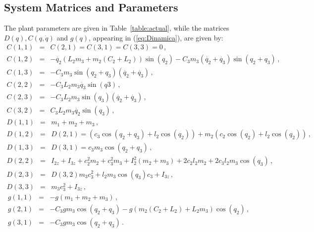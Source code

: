 \documentclass[letterpaper, 10 pt, journal, twocolumn]{IEEEtran}  %
\theoremstyle{plain}
\theoremstyle{definition}
\theoremstyle{remark}
\begin{document}
\begin{footnotesize}
\end{footnotesize}
 
%
%
%
%



\appendix


\subsection{System Matrices and Parameters}\label{ap:system}


The plant parameters are given in Table~\ref{table:actual}, while the matrices $D(q), C(q,\dot{q})$ and $g(q)$, appearing in (\ref{eq:Dinamica}), are given by:
%
\begin{eqnarray}
C(1,1) &=&  C(2,1) = C(3,1)=C(3,3)=0\,, \nonumber\\
C(1,2) & =& -\dot{q_2}(L_2m_3+m_2(C_2+L_2)) \sin(q_2)-C_3m_3(\dot{q_2}+\dot{q_3}) \sin(q_2+q_3)\,, \nonumber\\
C(1,3) &=&  -C_3 m_3 \sin(q_2+q_3)(\dot{q_2}+\dot{q_3})\,, \nonumber\\
C(2,2) &=&  -C_3 L_2 m_3\dot{q_3} \sin(q3)\,, \nonumber\\
C(2,3) &=&  -C_3 L_2 m_3 \sin(q_3)(\dot{q_2}+\dot{q_3})\,, \nonumber\\
C(3,2) &=&  C_3 L_2 m_3\dot{q_2} \sin(q_3)\,,\label{eq:defC}
\end{eqnarray}
%
%
\begin{eqnarray}
D(1,1) &=& m_1 + m_2 + m_3 \,, \nonumber \\
D(1,2) &=& D(2,1) = (c_3 \cos(q_2+q_3) + l_2 \cos(q_2)) + m_2 (c_2 \cos(q_2) + l_2 \cos (q_2) )\,, \nonumber \\
D(1,3) &=& D(3,1) = c_3 m_3 \cos( q_2 + q_3) \,, \nonumber \\
D(2,2) &=& I_{2z} + I_{3z} + c_2^2 m_2 + c_3^2 m_3 + I_2^2 (m_2 + m_3) + 2 c_2 l_2 m_2 + 2 c_3 l_2 m_3 \cos (q_3)\,, \nonumber\\
D(2,3) &=& D(3,2) m_3 c_3^2 + l_2 m_3 \cos (q_3 ) c_3 + I_{3z} \,,\nonumber \\
D(3,3) &=&  m_3 c_3^2 + I_{3z}\,,\label{eq:defD}
\end{eqnarray}
%
\begin{eqnarray}
g(1,1) &=&  -g(m_1+m_2+m_3)\,, \nonumber\\
g(2,1) &=&  -C_3 g m_3 \cos(q_2+q_3)-g (m_2(C_2+L_2)+L_2 m_3) \cos(q_2)\,, \nonumber\\
g(3,1) &=&  -C_3 g m_3 \cos(q_2+q_3)\,.
\label{eq:defg}
\end{eqnarray}
\end{document}
